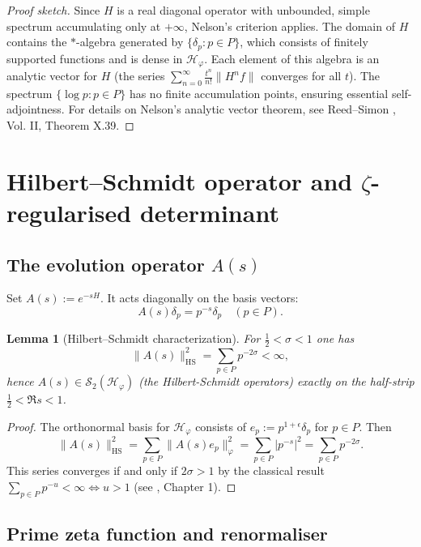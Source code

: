 \documentclass[12pt]{article}
\newtheorem{lemma}[theorem]{Lemma}
\theoremstyle{definition}
\theoremstyle{remark}
\newcommand{\Hspace}{\mathcal{H}}
\DeclareMathOperator{\HS}{HS}
\begin{document}
\begin{proof}[Proof sketch]
Since $H$ is a real diagonal operator with unbounded, simple spectrum accumulating only
at $+\infty$, Nelson's criterion applies. The domain of $H$ contains
the $*$-algebra generated by $\{\delta_p : p \in P\}$, which consists of finitely
supported functions and is dense in $\Hspace_{\varphi}$. Each element of this algebra
is an analytic vector for $H$ (the series $\sum_{n=0}^{\infty} \frac{t^n}{n!}\|H^n f\|$
converges for all $t$). The spectrum $\{\log p : p \in P\}$ has no finite accumulation 
points, ensuring essential self-adjointness. For details on Nelson's analytic vector
theorem, see Reed--Simon \cite{ReedSimon}, Vol. II, Theorem X.39.
\end{proof}

\section{Hilbert--Schmidt operator and $\zeta$-regularised determinant}\label{sec:HS}

\subsection{The evolution operator $A(s)$}
Set $A(s):=e^{-sH}$. It acts diagonally on the basis vectors:
\[
   A(s)\delta_{p}=p^{-s}\delta_{p}\quad (p\in P).
\]

\begin{lemma}[Hilbert--Schmidt characterization]\label{lem:HS}
For $\tfrac12<\sigma<1$ one has
\[
  \|A(s)\|_{\HS}^{2}
  =\sum_{p \in P}p^{-2\sigma}<\infty,
\]
hence $A(s)\in\mathcal{S}_{2}(\Hspace_{\varphi})$ (the Hilbert-Schmidt operators) 
exactly on the half-strip $\tfrac12<\Re s<1$.
\end{lemma}

\begin{proof}
The orthonormal basis for $\Hspace_{\varphi}$ consists of
$e_{p}:=p^{1+\epsilon}\delta_{p}$ for $p \in P$. Then
\[
  \|A(s)\|_{\HS}^{2}
  =\sum_{p \in P}\|A(s)e_{p}\|_{\varphi}^{2}
  =\sum_{p \in P}|p^{-s}|^{2}
  =\sum_{p \in P}p^{-2\sigma}.
\]
This series converges if and only if $2\sigma>1$ by the classical result
$\sum_{p \in P}p^{-u}<\infty\iff u>1$ (see \cite{Edwards}, Chapter 1).
\end{proof}

\subsection{Prime zeta function and renormaliser}
\end{document}
